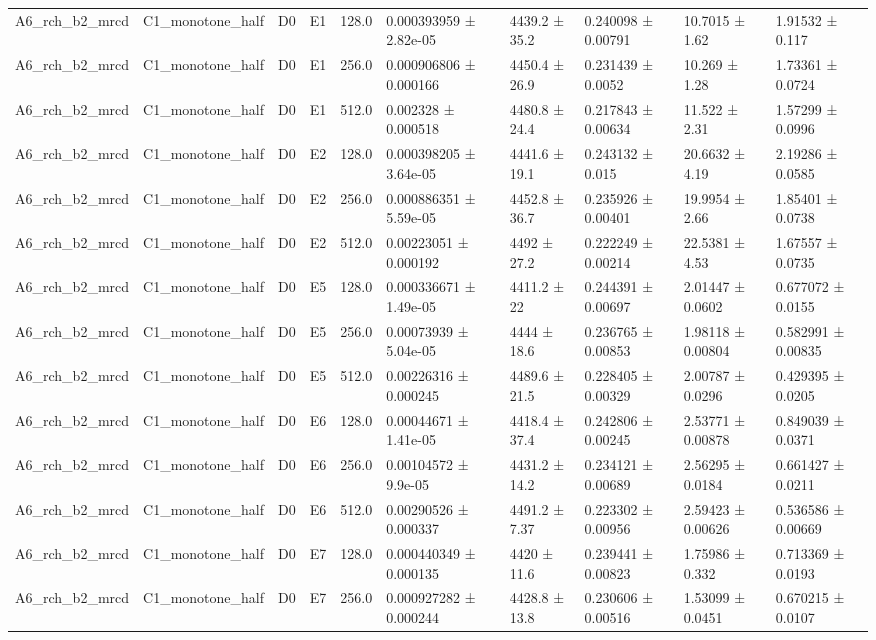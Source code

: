 \begin{table}
\begin{tabular}{llllllllll}
A6\_rch\_b2\_mrcd & C1\_monotone\_half & D0 & E1 & 128.0 & 0.000393959 ± 2.82e-05 & 4439.2 ± 35.2 & 0.240098 ± 0.00791 & 10.7015 ± 1.62 & 1.91532 ± 0.117 \\
A6\_rch\_b2\_mrcd & C1\_monotone\_half & D0 & E1 & 256.0 & 0.000906806 ± 0.000166 & 4450.4 ± 26.9 & 0.231439 ± 0.0052 & 10.269 ± 1.28 & 1.73361 ± 0.0724 \\
A6\_rch\_b2\_mrcd & C1\_monotone\_half & D0 & E1 & 512.0 & 0.002328 ± 0.000518 & 4480.8 ± 24.4 & 0.217843 ± 0.00634 & 11.522 ± 2.31 & 1.57299 ± 0.0996 \\
A6\_rch\_b2\_mrcd & C1\_monotone\_half & D0 & E2 & 128.0 & 0.000398205 ± 3.64e-05 & 4441.6 ± 19.1 & 0.243132 ± 0.015 & 20.6632 ± 4.19 & 2.19286 ± 0.0585 \\
A6\_rch\_b2\_mrcd & C1\_monotone\_half & D0 & E2 & 256.0 & 0.000886351 ± 5.59e-05 & 4452.8 ± 36.7 & 0.235926 ± 0.00401 & 19.9954 ± 2.66 & 1.85401 ± 0.0738 \\
A6\_rch\_b2\_mrcd & C1\_monotone\_half & D0 & E2 & 512.0 & 0.00223051 ± 0.000192 & 4492 ± 27.2 & 0.222249 ± 0.00214 & 22.5381 ± 4.53 & 1.67557 ± 0.0735 \\
A6\_rch\_b2\_mrcd & C1\_monotone\_half & D0 & E5 & 128.0 & 0.000336671 ± 1.49e-05 & 4411.2 ± 22 & 0.244391 ± 0.00697 & 2.01447 ± 0.0602 & 0.677072 ± 0.0155 \\
A6\_rch\_b2\_mrcd & C1\_monotone\_half & D0 & E5 & 256.0 & 0.00073939 ± 5.04e-05 & 4444 ± 18.6 & 0.236765 ± 0.00853 & 1.98118 ± 0.00804 & 0.582991 ± 0.00835 \\
A6\_rch\_b2\_mrcd & C1\_monotone\_half & D0 & E5 & 512.0 & 0.00226316 ± 0.000245 & 4489.6 ± 21.5 & 0.228405 ± 0.00329 & 2.00787 ± 0.0296 & 0.429395 ± 0.0205 \\
A6\_rch\_b2\_mrcd & C1\_monotone\_half & D0 & E6 & 128.0 & 0.00044671 ± 1.41e-05 & 4418.4 ± 37.4 & 0.242806 ± 0.00245 & 2.53771 ± 0.00878 & 0.849039 ± 0.0371 \\
A6\_rch\_b2\_mrcd & C1\_monotone\_half & D0 & E6 & 256.0 & 0.00104572 ± 9.9e-05 & 4431.2 ± 14.2 & 0.234121 ± 0.00689 & 2.56295 ± 0.0184 & 0.661427 ± 0.0211 \\
A6\_rch\_b2\_mrcd & C1\_monotone\_half & D0 & E6 & 512.0 & 0.00290526 ± 0.000337 & 4491.2 ± 7.37 & 0.223302 ± 0.00956 & 2.59423 ± 0.00626 & 0.536586 ± 0.00669 \\
A6\_rch\_b2\_mrcd & C1\_monotone\_half & D0 & E7 & 128.0 & 0.000440349 ± 0.000135 & 4420 ± 11.6 & 0.239441 ± 0.00823 & 1.75986 ± 0.332 & 0.713369 ± 0.0193 \\
A6\_rch\_b2\_mrcd & C1\_monotone\_half & D0 & E7 & 256.0 & 0.000927282 ± 0.000244 & 4428.8 ± 13.8 & 0.230606 ± 0.00516 & 1.53099 ± 0.0451 & 0.670215 ± 0.0107 \\

\end{tabular}
\end{table}
